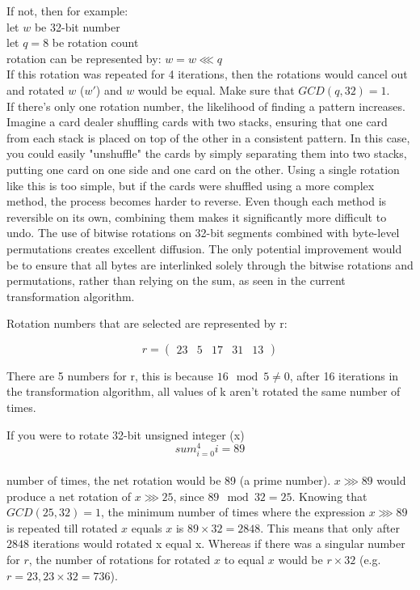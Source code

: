 \documentclass[fleqn, a4paper,12pt]{article}
\begin{document}
If not, then for example: \\
let $w$ be 32-bit number\\
let $q = 8$ be rotation count\\
rotation can be represented by: $w = w \lll q$\\
If this rotation was repeated for 4 iterations, then the rotations would cancel out and rotated $w$ ($w'$) and $w$ would be equal. Make sure that $GCD(q, 32) = 1$. \\

If there's only one rotation number, the likelihood of finding a pattern increases. Imagine a card dealer shuffling cards with two stacks, ensuring that one card from each stack is placed on top of the other in a consistent pattern. In this case, you could easily "unshuffle" the cards by simply separating them into two stacks, putting one card on one side and one card on the other. Using a single rotation like this is too simple, but if the cards were shuffled using a more complex method, the process becomes harder to reverse. Even though each method is reversible on its own, combining them makes it significantly more difficult to undo. The use of bitwise rotations on 32-bit segments combined with byte-level permutations creates excellent diffusion. The only potential improvement would be to ensure that all bytes are interlinked solely through the bitwise rotations and permutations, rather than relying on the sum, as seen in the current transformation algorithm.

Rotation numbers that are selected are represented by r:

\[
r = 
\begin{pmatrix}
		23 & 5 & 17 & 31 & 13
\end{pmatrix}
\]

There are 5 numbers for r, this is because $16 \mod 5 \neq 0$, after 16 iterations in the transformation algorithm, all values of k aren't rotated the same number of times.

If you were to rotate 32-bit unsigned integer (x)
\[
sum_{i=0}^4 i = 89
\]
\\
number of times, the net rotation would be 89 (a prime number). $x \ggg 89$ would produce a net rotation of $x \ggg 25$, since $89 \mod 32=25$. Knowing that $GCD(25, 32) = 1$, the minimum number of times where the expression $x \ggg 89$ is repeated till rotated $x$ equals $x$ is $89 \times 32 = 2848$. This means that only after $2848$ iterations would rotated x equal x. Whereas if there was a singular number for $r$, the number of rotations for rotated $x$ to equal $x$ would be $r \times 32$ (e.g. $r=23, 23 \times 32 = 736$). \\
\end{document}
